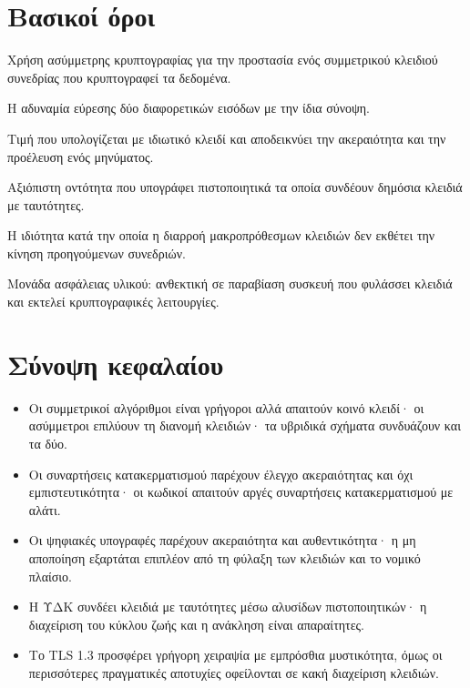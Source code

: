 \section*{Βασικοί όροι}
\begin{description}[style=nextline,leftmargin=1.2em]
  \item[Υβριδική κρυπτογράφηση] Χρήση ασύμμετρης κρυπτογραφίας για την προστασία ενός συμμετρικού κλειδιού συνεδρίας που κρυπτογραφεί τα δεδομένα.
  \item[Αντίσταση συγκρούσεων] Η αδυναμία εύρεσης δύο διαφορετικών εισόδων με την ίδια σύνοψη.
  \item[Ψηφιακή υπογραφή] Τιμή που υπολογίζεται με ιδιωτικό κλειδί και αποδεικνύει την ακεραιότητα και την προέλευση ενός μηνύματος.
  \item[Αρχή πιστοποίησης] Αξιόπιστη οντότητα που υπογράφει πιστοποιητικά τα οποία συνδέουν δημόσια κλειδιά με ταυτότητες.
  \item[Εμπρόσθια μυστικότητα] Η ιδιότητα κατά την οποία η διαρροή μακροπρόθεσμων κλειδιών δεν εκθέτει την κίνηση προηγούμενων συνεδριών.
  \item[HSM] Μονάδα ασφάλειας υλικού: ανθεκτική σε παραβίαση συσκευή που φυλάσσει κλειδιά και εκτελεί κρυπτογραφικές λειτουργίες.
\end{description}

\section*{Σύνοψη κεφαλαίου}
\begin{itemize}
  \item Οι συμμετρικοί αλγόριθμοι είναι γρήγοροι αλλά απαιτούν κοινό κλειδί· οι ασύμμετροι επιλύουν τη διανομή κλειδιών· τα υβριδικά σχήματα συνδυάζουν και τα δύο.
  \item Οι συναρτήσεις κατακερματισμού παρέχουν έλεγχο ακεραιότητας και όχι εμπιστευτικότητα· οι κωδικοί απαιτούν αργές συναρτήσεις κατακερματισμού με αλάτι.
  \item Οι ψηφιακές υπογραφές παρέχουν ακεραιότητα και αυθεντικότητα· η μη αποποίηση εξαρτάται επιπλέον από τη φύλαξη των κλειδιών και το νομικό πλαίσιο.
  \item Η ΥΔΚ συνδέει κλειδιά με ταυτότητες μέσω αλυσίδων πιστοποιητικών· η διαχείριση του κύκλου ζωής και η ανάκληση είναι απαραίτητες.
  \item Το TLS 1.3 προσφέρει γρήγορη χειραψία με εμπρόσθια μυστικότητα, όμως οι περισσότερες πραγματικές αποτυχίες οφείλονται σε κακή διαχείριση κλειδιών.
\end{itemize}

